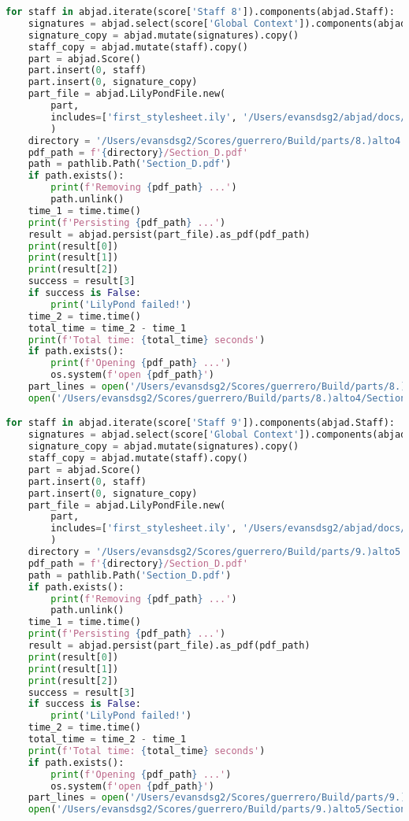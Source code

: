 \begin{lstlisting}[language=Python, caption=Invocation Source Code]
for staff in abjad.iterate(score['Staff 8']).components(abjad.Staff):
    signatures = abjad.select(score['Global Context']).components(abjad.Staff)
    signature_copy = abjad.mutate(signatures).copy()
    staff_copy = abjad.mutate(staff).copy()
    part = abjad.Score()
    part.insert(0, staff)
    part.insert(0, signature_copy)
    part_file = abjad.LilyPondFile.new(
        part,
        includes=['first_stylesheet.ily', '/Users/evansdsg2/abjad/docs/source/_stylesheets/abjad.ily'],
        )
    directory = '/Users/evansdsg2/Scores/guerrero/Build/parts/8.)alto4'
    pdf_path = f'{directory}/Section_D.pdf'
    path = pathlib.Path('Section_D.pdf')
    if path.exists():
        print(f'Removing {pdf_path} ...')
        path.unlink()
    time_1 = time.time()
    print(f'Persisting {pdf_path} ...')
    result = abjad.persist(part_file).as_pdf(pdf_path)
    print(result[0])
    print(result[1])
    print(result[2])
    success = result[3]
    if success is False:
        print('LilyPond failed!')
    time_2 = time.time()
    total_time = time_2 - time_1
    print(f'Total time: {total_time} seconds')
    if path.exists():
        print(f'Opening {pdf_path} ...')
        os.system(f'open {pdf_path}')
    part_lines = open('/Users/evansdsg2/Scores/guerrero/Build/parts/8.)alto4/Section_D.ly').readlines()
    open('/Users/evansdsg2/Scores/guerrero/Build/parts/8.)alto4/Section_D.ly', 'w').writelines(part_lines[15:-1])

for staff in abjad.iterate(score['Staff 9']).components(abjad.Staff):
    signatures = abjad.select(score['Global Context']).components(abjad.Staff)
    signature_copy = abjad.mutate(signatures).copy()
    staff_copy = abjad.mutate(staff).copy()
    part = abjad.Score()
    part.insert(0, staff)
    part.insert(0, signature_copy)
    part_file = abjad.LilyPondFile.new(
        part,
        includes=['first_stylesheet.ily', '/Users/evansdsg2/abjad/docs/source/_stylesheets/abjad.ily'],
        )
    directory = '/Users/evansdsg2/Scores/guerrero/Build/parts/9.)alto5'
    pdf_path = f'{directory}/Section_D.pdf'
    path = pathlib.Path('Section_D.pdf')
    if path.exists():
        print(f'Removing {pdf_path} ...')
        path.unlink()
    time_1 = time.time()
    print(f'Persisting {pdf_path} ...')
    result = abjad.persist(part_file).as_pdf(pdf_path)
    print(result[0])
    print(result[1])
    print(result[2])
    success = result[3]
    if success is False:
        print('LilyPond failed!')
    time_2 = time.time()
    total_time = time_2 - time_1
    print(f'Total time: {total_time} seconds')
    if path.exists():
        print(f'Opening {pdf_path} ...')
        os.system(f'open {pdf_path}')
    part_lines = open('/Users/evansdsg2/Scores/guerrero/Build/parts/9.)alto5/Section_D.ly').readlines()
    open('/Users/evansdsg2/Scores/guerrero/Build/parts/9.)alto5/Section_D.ly', 'w').writelines(part_lines[15:-1])


\end{lstlisting}
